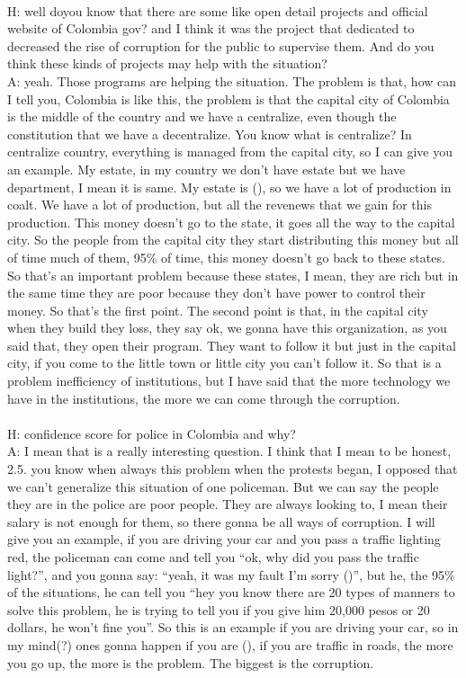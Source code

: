 \documentclass{phyasgn}\usepackage{nag}
\begin{document}
\\
H: well doyou know that there are some like open detail projects and official website of Colombia gov? and I think it was the project that dedicated to decreased the rise of corruption for the public to supervise them. And do you think these kinds of projects may help with the situation?\\
A: yeah. Those programs are helping the situation. The problem is that, how can I tell you, Colombia is like this, the problem is that the capital city of Colombia is the middle of the country and we have a centralize, even though the constitution that we have a decentralize. You know what is centralize? In centralize country, everything is managed from the capital city, so I can give you an example. My estate, in my country we don’t have estate but we have department, I mean it is same. My estate is (), so we have a lot of production in coalt. We have a lot of production, but all the revenews that we gain for this production. This money doesn’t go to the state, it goes all the way to the capital city. So the people from the capital city they start distributing this money but all of time much of them, 95\% of time, this money doesn’t go back to these states. So that’s an important problem because these states, I mean, they are rich but in the same time they are poor because they don’t have power to control their money. So that’s the first point. The second point is that, in the capital city when they build they loss, they say ok, we gonna have this organization, as you said that, they open their program. They want to follow it but just in the capital city, if you come to the little town or little city you can’t follow it. So that is a problem inefficiency of institutions, but I have said that the more  technology we have in the institutions, the more we can come through the corruption.\\ 
\\
H: confidence score for police in Colombia and why?\\
A: I mean that is a really interesting question. I think that I mean to be honest, 2.5. you know when always this problem when the protests began, I opposed that we can’t generalize this situation of one policeman. But we can say the people they are in the police are poor people. They are always looking to, I mean their salary is not enough for them, so there gonna be all ways of corruption. I will give you an example, if you are driving your car and you pass a traffic lighting red, the policeman can come and tell you “ok, why did you pass the traffic light?”, and you gonna say: “yeah, it was my fault I’m sorry ()”, but he, the 95\% of the situations, he can tell you “hey you know there are 20 types of manners to solve this problem, he is trying to tell you if you give him 20,000 pesos or 20 dollars, he won’t fine you”. So this is an example if you are driving your car, so in my mind(?) ones gonna happen if you are (), if you are traffic in roads, the more you go up, the more is the problem. The biggest is the corruption.\\
\end{document}
